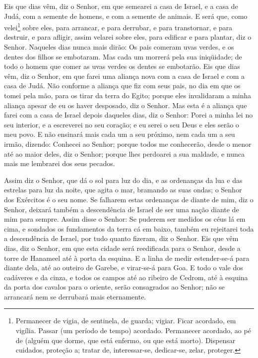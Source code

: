 Eis que dias vêm, diz o Senhor, em que semearei a casa de Israel,
e a casa de Judá, com a semente de homens, e com a semente de
animais. E será que, como velei\footnote{Permanecer de vigia,
de sentinela, de guarda; vigiar. Ficar acordado, em vigília. Passar
(um período de tempo) acordado. Permanecer acordado, ao pé de
(alguém que dorme, que está enfermo, ou que está morto). Dispensar
cuidados, proteção a; tratar de, interessar-se, dedicar-se, zelar,
proteger.} sobre eles, para arrancar, e para derrubar, e para
transtornar, e para destruir, e para afligir, assim velarei sobre
eles, para edificar e para plantar, diz o Senhor. Naqueles
dias nunca mais dirão: Os pais comeram uvas verdes, e os dentes dos
filhos se embotaram. Mas cada um morrerá pela sua iniqüidade;
de todo o homem que comer as uvas verdes os dentes se embotarão.
Eis que dias vêm, diz o Senhor, em que farei uma aliança nova
com a casa de Israel e com a casa de Judá. Não conforme a
aliança que fiz com seus pais, no dia em que os tomei pela mão, para
os tirar da terra do Egito; porque eles invalidaram a minha aliança
apesar de eu os haver desposado, diz o Senhor. Mas esta é a
aliança que farei com a casa de Israel depois daqueles dias, diz o
Senhor: Porei a minha lei no seu interior, e a escreverei no seu
coração; e eu serei o seu Deus e eles serão o meu povo. E não
ensinará mais cada um a seu próximo, nem cada um a seu irmão,
dizendo: Conhecei ao Senhor; porque todos me conhecerão, desde o
menor até ao maior deles, diz o Senhor; porque lhes perdoarei a sua
maldade, e nunca mais me lembrarei dos seus pecados.

Assim diz o Senhor, que dá o sol para luz do dia, e as ordenanças
da lua e das estrelas para luz da noite, que agita o mar, bramando
as suas ondas; o Senhor dos Exércitos é o seu nome. Se
falharem estas ordenanças de diante de mim, diz o Senhor, deixará
também a descendência de Israel de ser uma nação diante de mim para
sempre. Assim disse o Senhor: Se puderem ser medidos os céus
lá em cima, e sondados os fundamentos da terra cá em baixo, também
eu rejeitarei toda a descendência de Israel, por tudo quanto
fizeram, diz o Senhor. Eis que vêm dias, diz o Senhor, em que
esta cidade será reedificada para o Senhor, desde a torre de
Hanameel até à porta da esquina. E a linha de medir
estender-se-á para diante dela, até ao outeiro de Garebe, e
virar-se-á para Goa. E todo o vale dos cadáveres e da cinza,
e todos os campos até ao ribeiro de Cedrom, até à esquina da porta
dos cavalos para o oriente, serão consagrados ao Senhor; não se
arrancará nem se derrubará mais eternamente.


